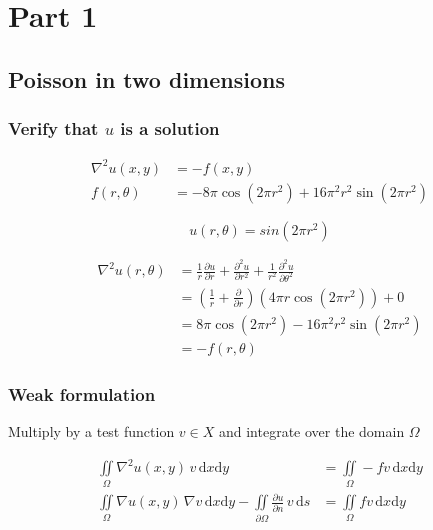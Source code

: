 \section{Part 1}

\subsection{Poisson in two dimensions}

\subsubsection{Verify that $u$ is a solution}

\begin{align}
\nabla^2 u(x,y) &= -f(x,y) \\
f(r, \theta) &= -8\pi \cos(2\pi r^2) + 16\pi^2r^2\sin(2\pi r^2)
\end{align}

\begin{equation}
u(r,\theta) = sin(2\pi r^2)
\end{equation}

\begin{align*}
\nabla^2 u(r,\theta) &= \frac{1}{r}\frac{\partial u}{\partial r} + \frac{\partial^2u}{\partial r^2} + \frac{1}{r^2}\frac{\partial^2 u}{\partial \theta^2} \\
&= \left(\frac{1}{r} + \frac{\partial}{\partial r}\right) \left(4\pi r \cos(2\pi r^2)\right) + 0 \\
& = 8\pi \cos(2\pi r^2) - 16\pi^2r^2\sin(2\pi r^2) \\
&= -f(r,\theta)
\end{align*}

\subsubsection{Weak formulation}

Multiply by a test function $v \in X$ and integrate over the domain $\Omega$

\begin{align*}
\iint\limits_{\Omega} \nabla^2 u(x,y) \, v \, \textrm{d}x \textrm{d}y &= \iint\limits_{\Omega} -f v \, \textrm{d}x \textrm{d}y \\
\iint\limits_{\Omega} \nabla u(x,y) \, \nabla v \, \textrm{d}x \textrm{d}y - \iint\limits_{\partial\Omega} \frac{\partial u}{\partial n} \, v \, \textrm{d}s  &= \iint\limits_{\Omega} f v \, \textrm{d}x \textrm{d}y
\end{align*}


